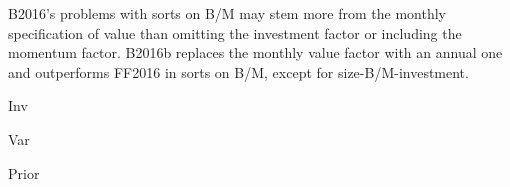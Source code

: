 B2016's problems with sorts on B/M may stem more from the monthly specification of value
than omitting the investment factor or including the momentum factor. B2016b replaces the
monthly value factor with an annual one and outperforms FF2016 in sorts on B/M, except for
size-B/M-investment.

{Inv}


{Var}

{Prior}
